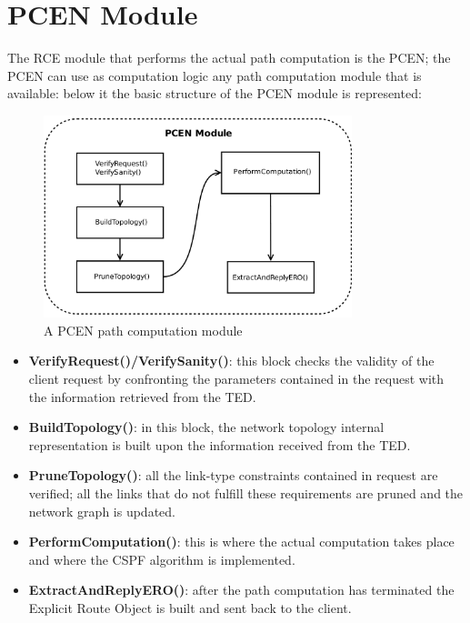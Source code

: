 \documentclass[10pt,a4paper]{report}
\begin{document}
\section{PCEN Module}

The RCE module that performs the actual path computation is the PCEN;
the PCEN can use as computation logic any path computation module that
is available: below it the basic structure of the PCEN module is
represented:

\begin{figure}[!htbp]
  \begin{center}
    \includegraphics[width=0.8\textwidth]{img/pcen_module}
    \caption[PCEN computation module]{A PCEN path computation module}
    \label{fig:pcen_module}
  \end{center}
\end{figure}

\begin{itemize}
\item \textbf{VerifyRequest()/VerifySanity()}: this block checks the validity
  of the client request by confronting the parameters contained in the
  request with the information retrieved from the TED.
\item \textbf{BuildTopology()}: in this block, the network topology
  internal representation is built upon the information received from
  the TED.
\item \textbf{PruneTopology()}: all the link-type constraints
  contained in request are verified; all the links that do not fulfill
  these requirements are pruned and the network graph is updated.
\item \textbf{PerformComputation()}: this is where the actual
  computation takes place and where the CSPF algorithm is implemented.
\item \textbf{ExtractAndReplyERO()}: after the path computation has
  terminated the Explicit Route Object is built and sent back to the
  client.
\end{itemize}
\end{document}
